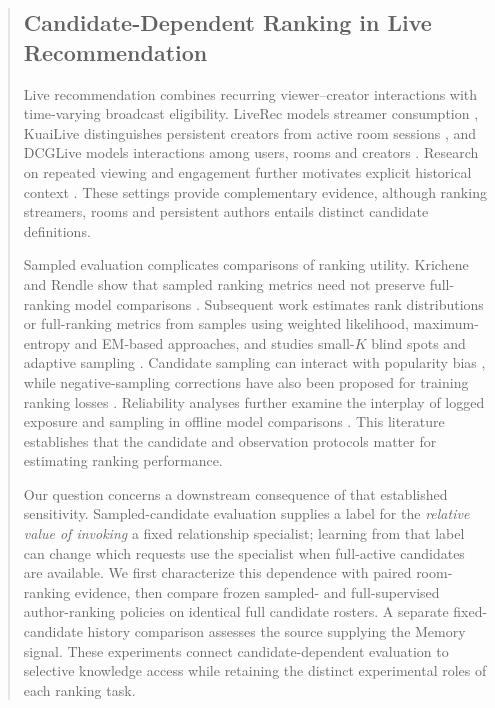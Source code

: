 \begin{abstract}
\subsection{Candidate-Dependent Ranking in Live Recommendation}

Live recommendation combines recurring viewer--creator interactions with time-varying broadcast eligibility. LiveRec models streamer consumption \cite{rappaz2021liverec}, KuaiLive distinguishes persistent creators from active room sessions \cite{qu2026kuailive}, and DCGLive models interactions among users, rooms and creators \cite{guo2026dcglive}. Research on repeated viewing and engagement further motivates explicit historical context \cite{gao2023driver,zhu2025repeated}. These settings provide complementary evidence, although ranking streamers, rooms and persistent authors entails distinct candidate definitions.

Sampled evaluation complicates comparisons of ranking utility. Krichene and Rendle show that sampled ranking metrics need not preserve full-ranking model comparisons \cite{krichene2020kdd}. Subsequent work estimates rank distributions or full-ranking metrics from samples using weighted likelihood, maximum-entropy and EM-based approaches, and studies small-$K$ blind spots and adaptive sampling \cite{jin2021sampledeval,li2023reliable,li2024itemsampling}. Candidate sampling can interact with popularity bias \cite{ihemelandu2023candidatesampling}, while negative-sampling corrections have also been proposed for training ranking losses \cite{subbiah2024rankestimation}. Reliability analyses further examine the interplay of logged exposure and sampling in offline model comparisons \cite{pereira2025samplingreliability}. This literature establishes that the candidate and observation protocols matter for estimating ranking performance.

Our question concerns a downstream consequence of that established sensitivity. Sampled-candidate evaluation supplies a label for the \emph{relative value of invoking} a fixed relationship specialist; learning from that label can change which requests use the specialist when full-active candidates are available. We first characterize this dependence with paired room-ranking evidence, then compare frozen sampled- and full-supervised author-ranking policies on identical full candidate rosters. A separate fixed-candidate history comparison assesses the source supplying the Memory signal. These experiments connect candidate-dependent evaluation to selective knowledge access while retaining the distinct experimental roles of each ranking task.




\end{abstract}
